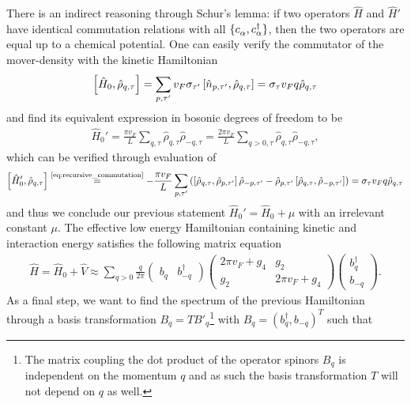 There is an indirect reasoning through Schur's lemma: if two operators $\hat H$ and $\hat H'$ have identical commutation relations with all $\{c^\pdag_\alpha,c^\dag_\alpha\}$, then the two operators are equal up to a chemical potential.
One can easily verify the commutator of the mover-density with the kinetic Hamiltonian
\begin{align}
    \left[ \hat H_0, \hat\rho_{q,\tau} \right]
    =
    \sum_{p,\tau'}v_F\sigma_{\tau'}\left[ \hat n_{p,\tau'},\hat\rho_{q,\tau} \right]
    =
    \sigma_\tau v_F q \hat\rho_{q,\tau}
\end{align}
and find its equivalent expression in bosonic degrees of freedom to be
\begin{align}
    \hat H_0' = \frac{\pi v_F}L\sum_{q,\tau}\hat\rho_{q,\tau}\hat\rho_{-q,\tau} = \frac{2\pi v_F}L\sum_{q>0,\tau}\hat\rho_{q,\tau}\hat\rho_{-q,\tau},
\end{align}
which can be verified through evaluation of
\begin{align}
    \commutator{\hat H_0',\hat\rho_{q,\tau}}
    \overset{\text{\cref{eq:recursive_commutation}}}{=}
    -\frac{\pi v_F}L
    \sum_{p,\tau'}
    \brlr{
    \commutator{\hat\rho_{q,\tau},\hat\rho_{p,\tau'}}\hat\rho_{-p,\tau'}
    -
    \hat\rho_{p,\tau'}\commutator{\hat\rho_{q,\tau},\hat\rho_{-p,\tau'}}
    }
    =
    \sigma_\tau v_F q\hat\rho_{q,\tau}
\end{align}
and thus we conclude our previous statement $\hat H_0' = \hat H_0 + \mu$ with an irrelevant constant $\mu$.
The effective low energy Hamiltonian containing kinetic and interaction energy satisfies the following matrix equation
\begin{align}
    \hat H = \hat H_0 + \hat V \approx
    \sum_{q>0}\frac{q}{2\pi}
    \begin{pmatrix}
        b_q & b^\dag_{-q}
    \end{pmatrix}
    \begin{pmatrix}
        2\pi v_F + g_4 & g_2 \\
        g_2 & 2\pi v_F + g_4
    \end{pmatrix}
    \begin{pmatrix}
        b^\dag_q \\ b_{-q}
    \end{pmatrix}
    .
    \label{eq:luttinger_hamiltonian_nondiagonal}
\end{align}
As a final step, we want to find the spectrum of the previous Hamiltonian through a basis transformation $B_q = T B'_q$\footnote{The matrix coupling the dot product of the operator spinors $B_q$ is independent on the momentum $q$ and as such the basis transformation $T$ will not depend on $q$ as well.} with $B_q = (b_q^\dag, b_{-q})^T$ such that
